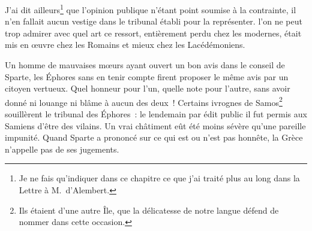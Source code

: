 \documentclass[french,twoside]{book} %
\begin{document}
J’ai dit ailleurs\footnote{Je ne fais qu’indiquer dans ce chapitre ce que j’ai traité plus au long dans la Lettre à M. d’Alembert.} que l’opinion publique n’étant point soumise à la contrainte, il n’en fallait aucun vestige dans le tribunal établi pour la représenter. l’on ne peut trop admirer avec quel art ce ressort, entièrement perdu chez les modernes, était mis en œuvre chez les Romains et mieux chez les Lacédémoniens.\par
Un homme de mauvaises mœurs ayant ouvert un bon avis dans le conseil de Sparte, les Éphores sans en tenir compte firent proposer le même avis par un citoyen vertueux. Quel honneur pour l’un, quelle note pour l’autre, sans avoir donné ni louange ni blâme à aucun des deux ! Certains ivrognes de Samos\footnote{Ils étaient d’une autre Île, que la délicatesse de notre langue défend de nommer dans cette occasion.} souillèrent le tribunal des Éphores : le lendemain par édit public il fut permis aux Samiens d’être des vilains. Un vrai châtiment eût été moins sévère qu’une pareille impunité. Quand Sparte a prononcé sur ce qui est ou n’est pas honnête, la Grèce n’appelle pas de ses jugements.
\end{document}
